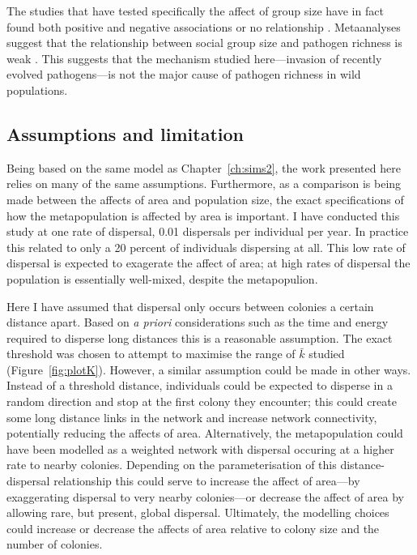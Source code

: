 The studies that have tested specifically the affect of group size have in fact found both positive \cite{vitone2004body} and negative associations \cite{gay2014parasite} or no relationship \cite{ezenwa2006host}.
Metaanalyses suggest that the relationship between social group size and pathogen richness is weak \cite{rifkin2012animals}.
This suggests that the mechanism studied here---invasion of recently evolved pathogens---is not the major cause of pathogen richness in wild populations.



\subsection{Assumptions and limitation}

Being based on the same model as Chapter~\ref{ch:sims2}, the work presented here relies on many of the same assumptions.
Furthermore, as a comparison is being made between the affects of area and population size, the exact specifications of how the metapopulation is affected by area is important.
I have conducted this study at one rate of dispersal, 0.01 dispersals per individual per year.
In practice this related to only a 20 percent of individuals dispersing at all.
This low rate of dispersal is expected to exagerate the affect of area; at high rates of dispersal the population is essentially well-mixed, despite the metapopulion.

Here I have assumed that dispersal only occurs between colonies a certain distance apart.
Based on \emph{a priori} considerations such as the time and energy required to disperse long distances this is a reasonable assumption.
The exact threshold was chosen to attempt to maximise the range of $\bar{k}$ studied (Figure~\ref{fig:plotK}).
However, a similar assumption could be made in other ways.
Instead of a threshold distance, individuals could be expected to disperse in a random direction and stop at the first colony they encounter; this could create some long distance links in the network and increase network connectivity, potentially reducing the affects of area.
Alternatively, the metapopulation could have been modelled as a weighted network with dispersal occuring at a higher rate to nearby colonies.
Depending on the parameterisation of this distance-dispersal relationship this could serve to increase the affect of area---by exaggerating dispersal to very nearby colonies---or decrease the affect of area by allowing rare, but present, global dispersal.
Ultimately, the modelling choices could increase or decrease the affects of area relative to colony size and the number of colonies.




